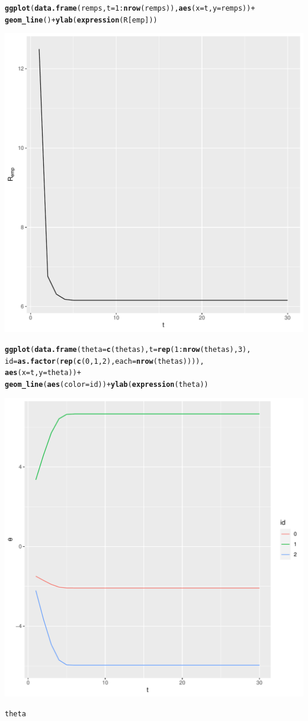 \documentclass[a4paper]{article}
\makeatletter
\newcommand{\hlnum}[1]{\textcolor[rgb]{0.686,0.059,0.569}{#1}}%
\newcommand{\hlopt}[1]{\textcolor[rgb]{0,0,0}{#1}}%
\newcommand{\hlstd}[1]{\textcolor[rgb]{0.345,0.345,0.345}{#1}}%
\newcommand{\hlkwc}[1]{\textcolor[rgb]{0.333,0.667,0.333}{#1}}%
\newcommand{\hlkwd}[1]{\textcolor[rgb]{0.737,0.353,0.396}{\textbf{#1}}}%
\newenvironment{kframe}{%
 \def\at@end@of@kframe{}%
 \ifinner\ifhmode%
  \def\at@end@of@kframe{\end{minipage}}%
  \begin{minipage}{\columnwidth}%
 \fi\fi%
 \def\FrameCommand##1{\hskip\@totalleftmargin \hskip-\fboxsep
 \colorbox{shadecolor}{##1}\hskip-\fboxsep
     \hskip-\linewidth \hskip-\@totalleftmargin \hskip\columnwidth}%
 \MakeFramed {\advance\hsize-\width
   \@totalleftmargin\z@ \linewidth\hsize
   \@setminipage}}%
 {\par\unskip\endMakeFramed%
 \at@end@of@kframe}
\newenvironment{knitrout}{}{} %
\makeatother
\begin{document}
{\begin{enumerate}
\begin{knitrout}
\begin{kframe}
\begin{alltt}
\hlkwd{ggplot}\hlstd{(}\hlkwd{data.frame}\hlstd{(remps,} \hlkwc{t}\hlstd{=}\hlnum{1}\hlopt{:}\hlkwd{nrow}\hlstd{(remps)),} \hlkwd{aes}\hlstd{(}\hlkwc{x}\hlstd{=t,} \hlkwc{y}\hlstd{=remps))} \hlopt{+}
  \hlkwd{geom_line}\hlstd{()} \hlopt{+} \hlkwd{ylab}\hlstd{(}\hlkwd{expression}\hlstd{(R[emp]))}
\end{alltt}
\end{kframe}
\includegraphics[width=0.4\linewidth]{figure/newton_raphson-plot-1} 
\begin{kframe}\begin{alltt}
\hlkwd{ggplot}\hlstd{(}\hlkwd{data.frame}\hlstd{(}\hlkwc{theta} \hlstd{=} \hlkwd{c}\hlstd{(thetas),} \hlkwc{t}\hlstd{=}\hlkwd{rep}\hlstd{(}\hlnum{1}\hlopt{:}\hlkwd{nrow}\hlstd{(thetas),}\hlnum{3}\hlstd{),}
                \hlkwc{id} \hlstd{=} \hlkwd{as.factor}\hlstd{(}\hlkwd{rep}\hlstd{(}\hlkwd{c}\hlstd{(}\hlnum{0}\hlstd{,} \hlnum{1}\hlstd{,} \hlnum{2}\hlstd{),} \hlkwc{each}\hlstd{=} \hlkwd{nrow}\hlstd{(thetas)))),}
       \hlkwd{aes}\hlstd{(}\hlkwc{x} \hlstd{= t,} \hlkwc{y}\hlstd{=theta))} \hlopt{+}
  \hlkwd{geom_line}\hlstd{(}\hlkwd{aes}\hlstd{(}\hlkwc{color} \hlstd{= id))} \hlopt{+} \hlkwd{ylab}\hlstd{(}\hlkwd{expression}\hlstd{(theta))}
\end{alltt}
\end{kframe}
\includegraphics[width=0.4\linewidth]{figure/newton_raphson-plot-2} 
\begin{kframe}\begin{alltt}
\hlstd{theta}
\end{alltt}

\end{kframe}
\end{knitrout}
\end{enumerate}}
\end{document}
